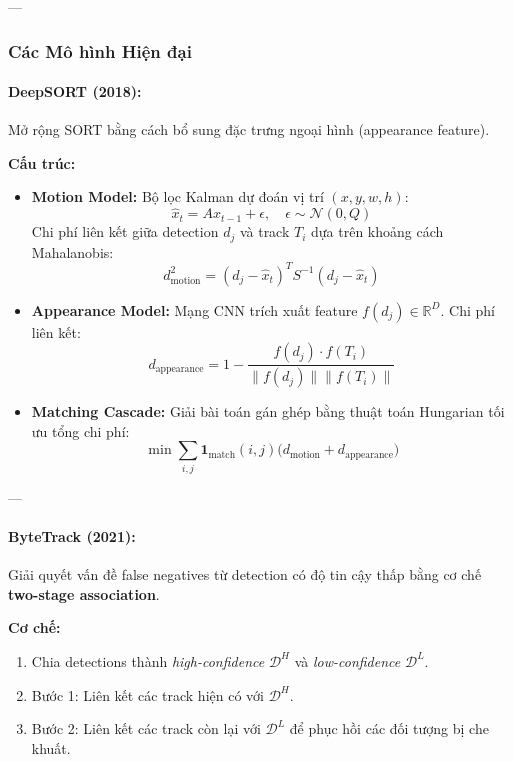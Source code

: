 ---

\subsubsection{Các Mô hình Hiện đại}
\label{subsubsec:tracking_models}

\paragraph{DeepSORT (2018):} \cite{Wojke2017}  
Mở rộng SORT bằng cách bổ sung đặc trưng ngoại hình (appearance feature).  

\textbf{Cấu trúc:}
\begin{itemize}
	\item \textbf{Motion Model:} Bộ lọc Kalman dự đoán vị trí $(x,y,w,h)$:
	\[
	\hat{x}_t = A x_{t-1} + \epsilon, \quad \epsilon \sim \mathcal{N}(0, Q)
	\]
	Chi phí liên kết giữa detection $d_j$ và track $T_i$ dựa trên khoảng cách Mahalanobis:
	\[
	d_{\text{motion}}^2 = (d_j - \hat{x}_t)^T S^{-1} (d_j - \hat{x}_t)
	\]
	\item \textbf{Appearance Model:} Mạng CNN trích xuất feature $f(d_j) \in \mathbb{R}^D$. Chi phí liên kết:
	\[
	d_{\text{appearance}} = 1 - \frac{f(d_j) \cdot f(T_i)}{\|f(d_j)\|\|f(T_i)\|}
	\]
	\item \textbf{Matching Cascade:} Giải bài toán gán ghép bằng thuật toán Hungarian tối ưu tổng chi phí:
	\[
	\min \sum_{i,j} \mathbf{1}_{\text{match}}(i,j) \big(d_{\text{motion}} + d_{\text{appearance}}\big)
	\]
\end{itemize}

---

\paragraph{ByteTrack (2021):} \cite{Zhang2022}  
Giải quyết vấn đề false negatives từ detection có độ tin cậy thấp bằng cơ chế \textbf{two-stage association}.

\textbf{Cơ chế:}
\begin{enumerate}
	\item Chia detections thành \textit{high-confidence} $\mathcal{D}^H$ và \textit{low-confidence} $\mathcal{D}^L$.
	\item Bước 1: Liên kết các track hiện có với $\mathcal{D}^H$.
	\item Bước 2: Liên kết các track còn lại với $\mathcal{D}^L$ để phục hồi các đối tượng bị che khuất.
\end{enumerate}

